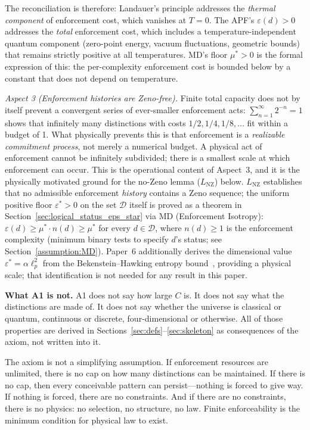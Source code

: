\documentclass[11pt]{article}
\theoremstyle{remark}
\begin{document}
The reconciliation is therefore: Landauer's principle addresses the \emph{thermal component} of enforcement cost, which vanishes at $T = 0$.  The APF's $\varepsilon(d) > 0$ addresses the \emph{total} enforcement cost, which includes a temperature-independent quantum component (zero-point energy, vacuum fluctuations, geometric bounds) that remains strictly positive at all temperatures.  MD's floor $\mu^* > 0$ is the formal expression of this: the per-complexity enforcement cost is bounded below by a constant that does not depend on temperature.

\textit{Aspect 3 (Enforcement histories are Zeno-free).}  Finite total capacity does not by itself prevent a convergent series of ever-smaller enforcement acts: $\sum_{n=1}^\infty 2^{-n} = 1$ shows that infinitely many distinctions with costs $1/2, 1/4, 1/8, \ldots$ fit within a budget of 1.  What physically prevents this is that enforcement is a \emph{realizable commitment process}, not merely a numerical budget.  A physical act of enforcement cannot be infinitely subdivided; there is a smallest scale at which enforcement can occur.  This is the operational content of Aspect~3, and it is the physically motivated ground for the no-Zeno lemma ($L_{\mathrm{NZ}}$) below.  $L_{\mathrm{NZ}}$ establishes that no admissible enforcement \emph{history} contains a Zeno sequence; the uniform positive floor $\varepsilon^* > 0$ on the set $\mathcal{D}$ itself is proved as a theorem in Section~\ref{sec:logical_status_eps_star} via MD (Enforcement Isotropy): $\varepsilon(d) \ge \mu^* \cdot n(d) \ge \mu^*$ for every $d \in \mathcal{D}$, where $n(d) \ge 1$ is the enforcement complexity (minimum binary tests to specify $d$'s status; see Section~\ref{assumption:MD}).  Paper~6 additionally derives the dimensional value $\varepsilon^* = \alpha\ell_p^2$ from the Bekenstein--Hawking entropy bound~\cite{Bekenstein1981}, providing a physical scale; that identification is not needed for any result in this paper.

\smallskip\noindent\textbf{What A1 is not.}
A1 does not say how large $C$ is.  It does not say what the distinctions are made of.  It does not say whether the universe is classical or quantum, continuous or discrete, four-dimensional or otherwise.  All of those properties are derived in Sections~\ref{sec:defs}--\ref{sec:skeleton} as consequences of the axiom, not written into it.

The axiom is not a simplifying assumption.  If enforcement resources are unlimited, there is no cap on how many distinctions can be maintained.  If there is no cap, then every conceivable pattern can persist---nothing is forced to give way.  If nothing is forced, there are no constraints.  And if there are no constraints, there is no physics: no selection, no structure, no law.  Finite enforceability is the minimum condition for physical law to exist.
\end{document}
